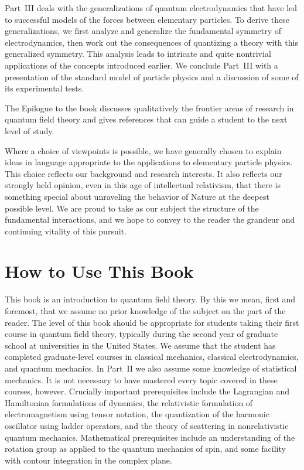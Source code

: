 Part~III deals with the generalizations of quantum electrodynamics that
have led to successful models of the forces between elementary particles.
To derive these generalizations, we first analyze and generalize the
fundamental symmetry of electrodynamics, then work out the consequences of
quantizing a theory with this generalized symmetry.  This analysis leads
to intricate and quite nontrivial applications of the concepts introduced
earlier.  We conclude Part~III with a presentation of the standard model
of particle physics and a discussion of some of its experimental tests.

The Epilogue to the book discusses qualitatively the frontier areas of
research in quantum field theory and gives references that can guide a
student to the next level of study.

Where a choice of viewpoints is possible, we have generally chosen to
explain ideas in language appropriate to the applications to elementary
particle physics.  This choice reflects our background and research
interests.  It also reflects our strongly held opinion, even in this age
of intellectual relativism, that there is something special about
unraveling the behavior of Nature at the deepest possible level.  We are
proud to take as our subject the structure of the fundamental
interactions, and we hope to convey to the reader the grandeur and
continuing vitality of this pursuit.

\section*{How to Use This Book}

This book is an introduction to quantum field theory.  By this we mean,
first and foremost, that we assume no prior knowledge of the subject on
the part of the reader.  The level of this book should be appropriate for
students taking their first course in quantum field theory, typically
during the second year of graduate school at universities in the United
States.  We assume that the student has completed graduate-level courses
in classical mechanics, classical electrodynamics, and quantum mechanics.
In Part~II we also assume some knowledge of statistical mechanics.  It is
not necessary to have mastered every topic covered in these courses,
however.  Crucially important prerequisites include the Lagrangian and
Hamiltonian formulations of dynamics, the relativistic formulation of
electromagnetism using tensor notation, the quantization of the harmonic
oscillator using ladder operators, and the theory of scattering in
nonrelativistic quantum mechanics.  Mathematical prerequisites include an
understanding of the rotation group as applied to the quantum mechanics of
spin, and some facility with contour integration in the complex plane.

